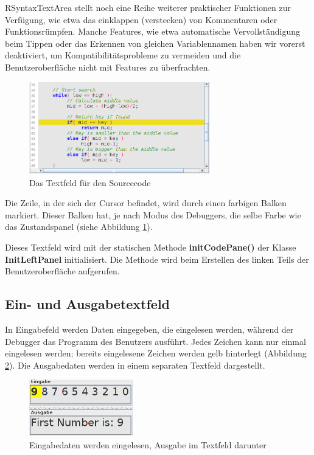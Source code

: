 RSyntaxTextArea stellt noch eine Reihe weiterer praktischer Funktionen zur Verfügung, wie etwa das einklappen (verstecken) von Kommentaren oder Funktionsrümpfen. Manche Features, wie etwa automatische Vervollständigung beim Tippen oder das Erkennen von gleichen Variablennamen haben wir vorerst deaktiviert, um Kompatibilitätsprobleme zu vermeiden und die Benutzeroberfläche nicht mit Features zu überfrachten.

\begin{figure}[h!] 
  \centering
     \includegraphics[width=0.7\textwidth]{./media/images/gui/main/CCompact-gui-left-code-2.png}
  \caption{Das Textfeld für den Sourcecode}
  \label{fig:gui-main-left-code}
\end{figure}

Die Zeile, in der sich der Cursor befindet, wird durch einen farbigen Balken markiert. Dieser Balken hat, je nach Modus des Debuggers, die selbe Farbe wie das Zustandspanel (siehe Abbildung \ref{fig:gui-main-left-code}).

Dieses Textfeld wird mit der statischen Methode \textbf{initCodePane()} der Klasse \textbf{InitLeftPanel} initialisiert. Die Methode wird beim Erstellen des linken Teils der Benutzeroberfläche aufgerufen.

\subsection{Ein- und Ausgabetextfeld}
\label{sec:gui-main-left-io}

In Eingabefeld werden Daten eingegeben, die eingelesen werden, während der Debugger das Programm des Benutzers ausführt. Jedes Zeichen kann nur einmal eingelesen werden; bereits eingelesene Zeichen werden gelb hinterlegt (Abbildung \ref{fig:gui-main-left-io}). Die Ausgabedaten werden in einem separaten Textfeld dargestellt.

\begin{figure}[h!] 
  \centering
     \includegraphics[width=0.4\textwidth]{./media/images/gui/main/io.png}
  \caption{Eingabedaten werden eingelesen, Ausgabe im Textfeld darunter}
  \label{fig:gui-main-left-io}
\end{figure}

